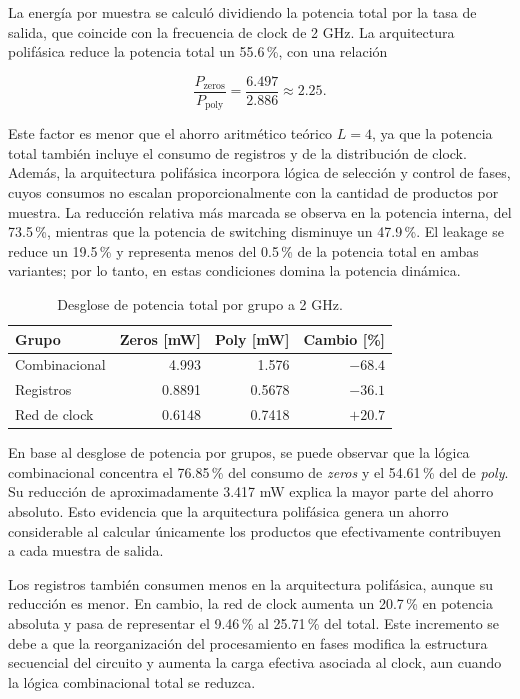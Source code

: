 \documentclass[10pt,a4paper]{article}
\begin{document}
La energía por muestra se calculó dividiendo la potencia total por la tasa de
salida, que coincide con la frecuencia de clock de 2 GHz. La arquitectura
polifásica reduce la potencia total un 55.6\,\%, con una relación

\begin{equation}
\frac{P_{\mathrm{zeros}}}{P_{\mathrm{poly}}}
=
\frac{6.497}{2.886}
\approx 2.25.
\label{eq:relacion-potencias}
\end{equation}

Este factor es menor que el ahorro aritmético teórico $L=4$, ya que la potencia
total también incluye el consumo de registros y de la distribución de clock.
Además, la arquitectura polifásica incorpora lógica de selección y control de
fases, cuyos consumos no escalan proporcionalmente con la cantidad de productos
por muestra. La reducción relativa más marcada se observa en la potencia interna,
del 73.5\,\%, mientras que la potencia de switching disminuye un 47.9\,\%. El
leakage se reduce un 19.5\,\% y representa menos del 0.5\,\% de la potencia total
en ambas variantes; por lo tanto, en estas condiciones domina la potencia dinámica.

\begin{table}[H]
    \centering
    \caption{Desglose de potencia total por grupo a 2 GHz.}
    \label{tab:potencia-grupos-inicial}
    \begin{tabular}{@{}lrrr@{}}
        \toprule
        \textbf{Grupo} & \textbf{Zeros [mW]} & \textbf{Poly [mW]} &
        \textbf{Cambio [\%]} \\
        \midrule
        Combinacional & 4.993  & 1.576  & $-68.4$ \\
        Registros     & 0.8891 & 0.5678 & $-36.1$ \\
        Red de clock  & 0.6148 & 0.7418 & $+20.7$ \\
        \bottomrule
    \end{tabular}
\end{table}

En base al desglose de potencia por grupos, se puede observar que la lógica
combinacional concentra el 76.85\,\% del consumo de \textit{zeros} y el
54.61\,\% del de \textit{poly}. Su reducción de aproximadamente 3.417 mW explica
la mayor parte del ahorro absoluto. Esto evidencia que la arquitectura polifásica
genera un ahorro considerable al calcular únicamente los productos que
efectivamente contribuyen a cada muestra de salida.

Los registros también consumen menos en la arquitectura polifásica, aunque su
reducción es menor. En cambio, la red de clock aumenta un 20.7\,\% en potencia
absoluta y pasa de representar el 9.46\,\% al 25.71\,\% del total. Este incremento
se debe a que la reorganización del procesamiento en fases modifica la estructura
secuencial del circuito y aumenta la carga efectiva asociada al clock, aun cuando
la lógica combinacional total se reduzca.
\end{document}
